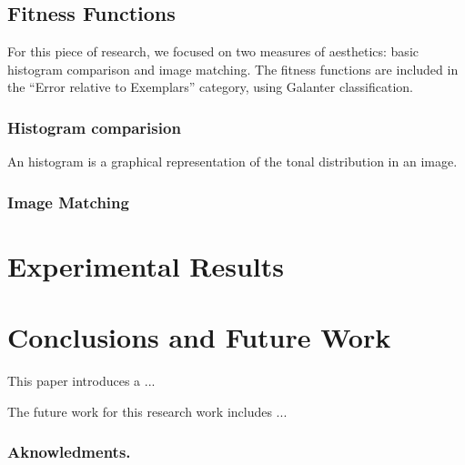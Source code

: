 \documentclass[conference]{IEEEtran}
\begin{document}
\subsection{Fitness Functions}\label{go:fitness} 
For this piece of research, we focused on two measures of aesthetics: basic histogram comparison and image matching. The fitness functions are included in the ``Error relative to Exemplars'' category, using Galanter \cite{galanter2012computational} classification.
\subsubsection{Histogram comparision}\label{go:fitness:hist}
An histogram is a graphical representation of the tonal distribution in an image. 
\subsubsection{Image Matching}\label{go:fitness:image_match}

\section{Experimental Results} \label{exper}

\section{Conclusions and Future Work}\label{conclusions}
This paper introduces a ...

The future work for this research work includes ...
\subsubsection*{Aknowledments.} 



\end{document}
